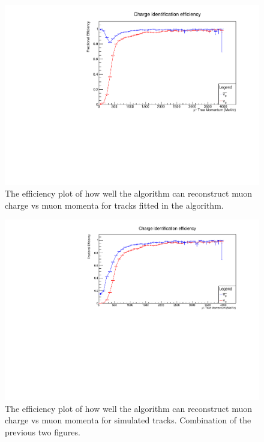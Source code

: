 \begin{figure}[h!]
\centering
\includegraphics[width=.9\textwidth]{figures/NeutrinoChap/Neutrino/T2KIronChargeEff.pdf}
\caption{The efficiency plot of how well the algorithm can reconstruct muon charge vs muon momenta for tracks fitted in the algorithm.}
\label{fig:IronMINDfittedcharge}
\end{figure}

\begin{figure}[h!]
\centering
\includegraphics[width=.9\textwidth]{figures/NeutrinoChap/NuFactTalk/fix3.pdf}
\caption{The efficiency plot of how well the algorithm can reconstruct muon charge vs muon momenta for simulated tracks. Combination of the previous two figures.}
\label{fig:IronMINDCombined}
\end{figure}

